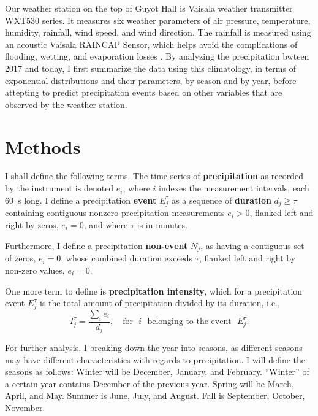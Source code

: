 \documentclass[11pt]{report}
\newcommand{\fracd}[2]{\frac{\displaystyle{#1}}{\displaystyle{#2}}}
\begin{document}
% 

Our weather station on the top of Guyot Hall is Vaisala weather
transmitter WXT530 series. It measures six weather parameters of air
pressure, temperature, humidity, rainfall, wind speed, and wind
direction. The rainfall is measured using an acoustic Vaisala RAINCAP
Sensor, which helps avoid the complications of flooding, wetting, and
evaporation losses \cite[]{Vaisala}. By analyzing the precipitation
bwteen 2017 and today, I first summarize the data using this
climatology, in terms of exponential distributions and their
parameters, by season and by year, before attepting to predict
precipitation events based on other variables that are observed by the
weather station.

\section{Methods \label{sec:methods}}

I shall define the following terms. The time series of
\textbf{precipitation} as recorded by the instrument is denoted $e_i$,
where $i$ indexes the measurement intervals, each 60~s long. I define
a precipitation \textbf{event} $E_j^\tau $ as a sequence of
\textbf{duration} $d_j\ge \tau$ containing contiguous nonzero
precipitation measurements $e_i>0$, flanked left and right by zeros,
$e_i=0$, and where $\tau$ is in minutes.

Furthermore, I define a precipitation \textbf{non-event} $N_j^\tau$,
  as having a contiguous set of zeros, $e_i=0$, whose combined duration
  exceeds $\tau$, flanked left and right by non-zero values, $e_i=0$.

One more term to define is \textbf{precipitation intensity}, which for
a precipitation event $E_j^\tau$ is the total amount of precipitation
divided by its duration, i.e., 
\begin{equation}
I_j^\tau = \fracd{\sum_i e_i }{d_j} ,
\quad
\mbox{for}\,\,\,\, i\,\,\,\, \mbox{belonging to the event}\,\,\,\, E_j^\tau
.
\end{equation}



For further analysis, I breaking down the year into seasons, as
different seasons may have different characteristics with regards to
precipitation. I will define the seasons as follows: Winter will be
December, January, and February. ``Winter'' of a certain year contains
December of the previous year.  Spring will be March, April, and
May. Summer is June, July, and August. Fall is September, October,
November.
\end{document}
